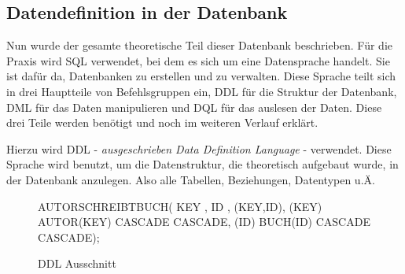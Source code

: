 \newpage
\subsection{Datendefinition in der Datenbank}


Nun wurde der gesamte theoretische Teil dieser Datenbank beschrieben. Für die Praxis wird SQL verwendet, bei dem es sich um eine Datensprache handelt. Sie ist dafür da, Datenbanken zu erstellen und zu verwalten. Diese Sprache teilt sich in drei Hauptteile von Befehlsgruppen ein, DDL für die Struktur der Datenbank, DML für das Daten manipulieren und DQL für das auslesen der Daten. Diese drei Teile werden benötigt und noch im weiteren Verlauf erklärt.

Hierzu wird DDL - \textit{ausgeschrieben Data Definition Language} - verwendet. Diese Sprache wird benutzt, um die Datenstruktur, die theoretisch aufgebaut wurde, in der Datenbank anzulegen. Also alle Tabellen, Beziehungen, Datentypen u.Ä.


\begin{figure}[!htb]
	 AUTORSCHREIBTBUCH( \newline
	KEY  ,\newline
	ID         ,\newline
	(KEY,ID),\newline
	(KEY)  AUTOR(KEY)\newline
	 CASCADE  CASCADE,\newline
	(ID)  BUCH(ID)\newline
	 CASCADE  CASCADE);\newline
	\caption{DDL Ausschnitt}
	\label{fig:ddlbeispiel}
\end{figure}


